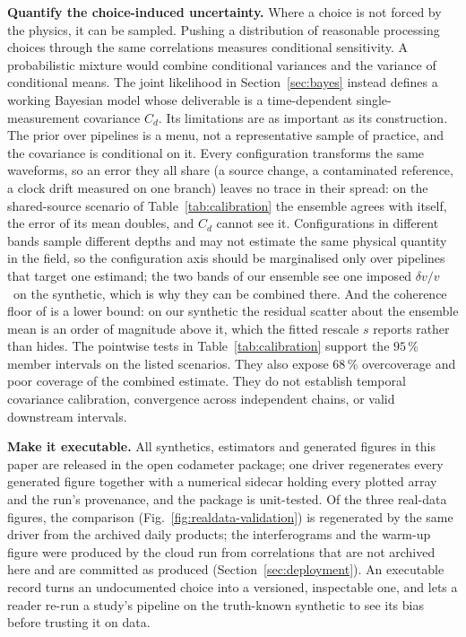 \documentclass[
  referee]{gji}
\providecommand{\dvv}{\ensuremath{\delta v/v}}
\begin{document}
\textbf{Quantify the choice-induced uncertainty.} Where a choice is not
forced by the physics, it can be sampled. Pushing a distribution of
reasonable processing choices through the same correlations measures
conditional sensitivity. A probabilistic mixture would combine
conditional variances and the variance of conditional means. The joint
likelihood in Section~\ref{sec:bayes} instead defines a working Bayesian
model whose deliverable is a time-dependent single-measurement
covariance \(C_d\). Its limitations are as important as its
construction. The prior over pipelines is a menu, not a representative
sample of practice, and the covariance is conditional on it. Every
configuration transforms the same waveforms, so an error they all share
(a source change, a contaminated reference, a clock drift measured on
one branch) leaves no trace in their spread: on the shared-source
scenario of Table~\ref{tab:calibration} the ensemble agrees with itself,
the error of its mean doubles, and \(C_d\) cannot see it. Configurations
in different bands sample different depths and may not estimate the same
physical quantity in the field, so the configuration axis should be
marginalised only over pipelines that target one estimand; the two bands
of our ensemble see one imposed \dvv~on the synthetic, which is why they
can be combined there. And the coherence floor of \citet{Weaver2011} is
a lower bound: on our synthetic the residual scatter about the ensemble
mean is an order of magnitude above it, which the fitted rescale \(s\)
reports rather than hides. The pointwise tests in
Table~\ref{tab:calibration} support the \(95\,\%\) member intervals on
the listed scenarios. They also expose \(68\,\%\) overcoverage and poor
coverage of the combined estimate. They do not establish temporal
covariance calibration, convergence across independent chains, or valid
downstream intervals.

\textbf{Make it executable.} All synthetics, estimators and generated
figures in this paper are released in the open codameter package; one
driver regenerates every generated figure together with a numerical
sidecar holding every plotted array and the run's provenance, and the
package is unit-tested. Of the three real-data figures, the comparison
(Fig.~\ref{fig:realdata-validation}) is regenerated by the same driver
from the archived daily products; the interferograms and the warm-up
figure were produced by the cloud run from correlations that are not
archived here and are committed as produced
(Section~\ref{sec:deployment}). An executable record turns an
undocumented choice into a versioned, inspectable one, and lets a reader
re-run a study's pipeline on the truth-known synthetic to see its bias
before trusting it on data.
\end{document}
